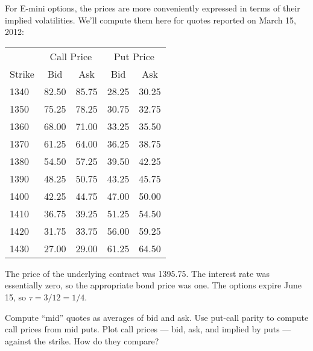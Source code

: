 \documentclass[11pt]{exam}
\begin{document}
\begin{questions}
\begin{solution}
\end{solution}


For E-mini options,
the prices are more conveniently expressed in
terms of their implied volatilities.
We'll compute them here for quotes reported on March 15, 2012:

\begin{center}
\tabcolsep=0.15in
\begin{tabular}{lcccc}
\toprule
      &  \multicolumn{2}{c}{Call Price} &  \multicolumn{2}{c}{Put Price}  \\
Strike    &  Bid & Ask &  Bid & Ask  \\
\midrule
1340  & 82.50 & 85.75 & 28.25 & 30.25 \\
1350  & 75.25 & 78.25 & 30.75 & 32.75 \\
1360  & 68.00 & 71.00 & 33.25 & 35.50  \\
1370  & 61.25 & 64.00 & 36.25 & 38.75 \\
1380  & 54.50 & 57.25 & 39.50 & 42.25 \\
1390  & 48.25 & 50.75 & 43.25 & 45.75  \\
1400  & 42.25 & 44.75 & 47.00 & 50.00  \\
1410  & 36.75 & 39.25 & 51.25 & 54.50   \\
1420  & 31.75 & 33.75 & 56.00 & 59.25 \\
1430  & 27.00 & 29.00 & 61.25 & 64.50  \\
\bottomrule
\end{tabular}
\end{center}
The price of the underlying contract was 1395.75.
The interest rate was essentially zero, so the appropriate bond price was one.
The options expire June 15, so $\tau = 3/12 = 1/4 $.

\begin{parts}
\item Compute ``mid'' quotes as averages of bid and ask.
Use put-call parity to compute call prices from mid puts.
Plot call prices --- bid, ask, and implied by puts ---
against the strike.
How do they compare?


\end{parts}
\end{questions}
\end{document}
